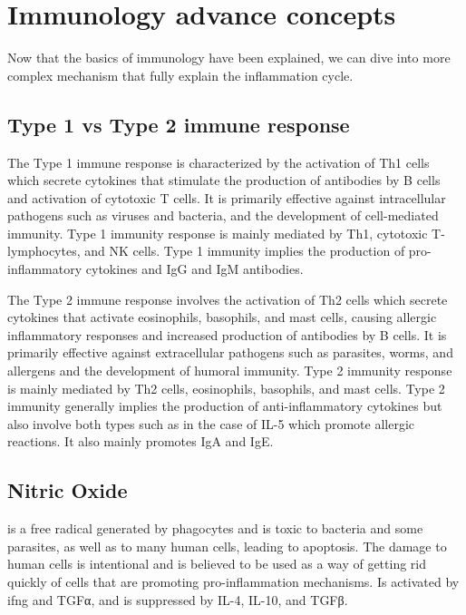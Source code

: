 \section{Immunology advance concepts}

Now that the basics of immunology have been explained, we can dive into more complex mechanism that fully explain the inflammation cycle.

\subsection{Type 1 vs Type 2 immune response}

The Type 1 immune response is characterized by the activation of Th1 cells which secrete cytokines that stimulate the production of antibodies by B cells and activation of cytotoxic T cells. It is primarily effective against intracellular pathogens such as viruses and bacteria, and the development of cell-mediated immunity. Type 1 immunity response is mainly mediated by Th1, cytotoxic T-lymphocytes, and NK cells. Type 1 immunity implies the production of pro-inflammatory cytokines and IgG and IgM antibodies.

The Type 2 immune response involves the activation of Th2 cells which secrete cytokines that activate eosinophils, basophils, and mast cells, causing allergic inflammatory responses and increased production of antibodies by B cells. It is primarily effective against extracellular pathogens such as parasites, worms, and allergens and the development of humoral immunity. Type 2 immunity response is mainly mediated by Th2 cells, eosinophils, basophils, and mast cells. Type 2 immunity generally implies the production of anti-inflammatory cytokines but also involve both types such as in the case of IL-5 which promote allergic reactions. It also mainly promotes IgA and IgE.


\subsection{Nitric Oxide}
\label{in:NO}

 is a free radical generated by phagocytes and is toxic to bacteria and some parasites, as well as to many human cells, leading to apoptosis. The damage to human cells is intentional and is believed to be used as a way of getting rid quickly of cells that are promoting pro-inflammation mechanisms. Is activated by \gls{ifng} and TGFα, and is suppressed by IL-4, IL-10, and TGFβ.

